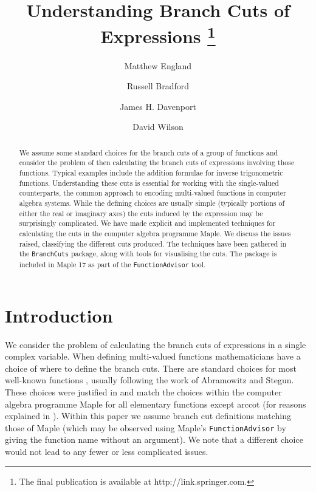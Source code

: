 \documentclass{llncs}
\begin{document}
\title{Understanding Branch Cuts of Expressions
\thanks{The final publication is available at http://link.springer.com.}
}
\author{Matthew England \and Russell Bradford \and James H. Davenport \and David Wilson}
\maketitle



\begin{abstract}

We assume some standard choices for the branch cuts of a group of functions and consider the problem of then calculating the branch cuts of expressions involving those functions. Typical examples include the addition formulae for inverse trigonometric functions.  Understanding these cuts is essential for working with the single-valued counterparts, the common approach to encoding multi-valued functions in computer algebra systems.  While the defining choices are usually simple (typically portions of either the real or imaginary axes) the cuts induced by the expression may be surprisingly complicated.  We have made explicit and implemented techniques for calculating the cuts in the computer algebra programme {\sc Maple}. We discuss the issues raised, classifying the different cuts produced. The techniques have been gathered in the \texttt{BranchCuts} package, along with tools for visualising the cuts.  The package is included in {\sc Maple 17} as part of the \texttt{FunctionAdvisor} tool.






\end{abstract}



\section{Introduction} \label{SEC:Intro}

We consider the problem of calculating the branch cuts of expressions in a single complex variable.  When defining multi-valued functions mathematicians have a choice of where to define the branch cuts.  There are standard choices for most well-known functions \cite{AS64, OLBC2010, NIST}, usually following the work of Abramowitz and Stegun.  These choices were justified in \cite{CDJW00} and match the choices within the computer algebra programme {\sc Maple} for all elementary functions except arccot (for reasons explained in \cite{CDJW00}).  Within this paper we assume branch cut definitions matching those of {\sc Maple} (which may be observed using Maple's \verb+FunctionAdvisor+ by giving the function name without an argument).  We note that a different choice would not lead to any fewer or less complicated issues.
\end{document}
